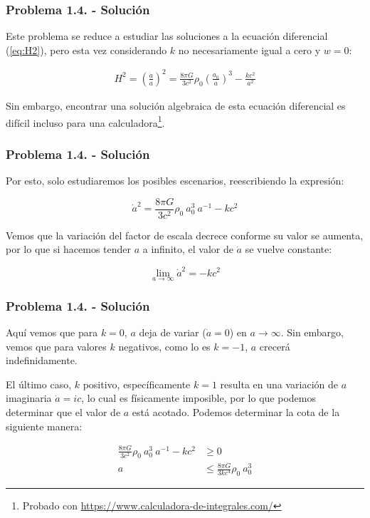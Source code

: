 \begin{frame}
    \frametitle{Problema 1.4. - Solución}

    Este problema se reduce a estudiar las soluciones a la ecuación diferencial (\ref{eq:H2}), pero esta vez considerando $k$ no necesariamente igual a cero y $w=0$:

    \begin{align*}
        H^2=\left(\frac{\dot{a}}{a}\right)^2=\frac{8\pi G}{3c^2}\rho_0\left(\frac{a_0}{a}\right)^{3}-\frac{kc^2}{a^2}
    \end{align*}

    Sin embargo, encontrar una solución algebraica de esta ecuación diferencial es difícil incluso para una calculadora\footnote{Probado con \url{https://www.calculadora-de-integrales.com/}}.

\end{frame}

\begin{frame}
    \frametitle{Problema 1.4. - Solución}

    Por esto, solo estudiaremos los posibles escenarios, reescribiendo la expresión:

    \begin{equation*}
        \dot{a}^2=\frac{8\pi G}{3c^2}\rho_0~a_0^3~a^{-1}-kc^2
    \end{equation*}

    Vemos que la variación del factor de escala decrece conforme su valor se aumenta, por lo que si hacemos tender $a$ a infinito, el valor de $\dot{a}$ se vuelve constante:

    \begin{equation*}
        \lim_{a\rightarrow\infty} \dot{a}^2 = -kc^2
    \end{equation*}

\end{frame}

\begin{frame}
    \frametitle{Problema 1.4. - Solución}

    Aquí vemos que para $k=0$, $a$ deja de variar ($\dot{a}=0$) en $a\rightarrow \infty$. Sin embargo, vemos que para valores $k$ negativos, como lo es $k=-1$, $a$ crecerá indefinidamente.

    El último caso, $k$ positivo, específicamente $k=1$ resulta en una variación de $a$ imaginaria $\dot{a}=ic$, lo cual es físicamente imposible, por lo que podemos determinar que el valor de $a$ está acotado. Podemos determinar la cota de la siguiente manera:

    \begin{align*}
        \frac{8\pi G}{3c^2}\rho_0~a_0^3~a^{-1}-kc^2&\geq 0\\
        a&\leq \frac{8\pi G}{3kc^4}\rho_0~a_0^3
    \end{align*}

\end{frame}

